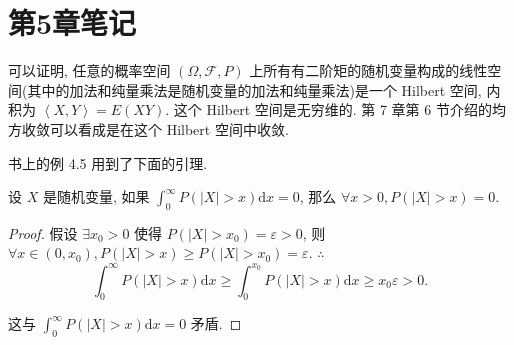 \documentclass{ctexart}
\begin{document}
\section{第5章笔记}
可以证明, 任意的概率空间 $(\Omega,\mathcal{F},P)$ 上所有有二阶矩的随机变量构成的线性空间(其中的加法和纯量乘法是随机变量的加法和纯量乘法)是一个 Hilbert 空间, 内积为 $\left<X,Y\right>=E(XY)$. 这个 Hilbert 空间是无穷维的. 第 7 章第 6 节介绍的均方收敛可以看成是在这个 Hilbert 空间中收敛.

书上的例 4.5 用到了下面的引理.
\begin{lemma}
    设 $X$ 是随机变量, 如果 $\int_0^\infty P(|X|>x)\mathrm{d}x=0$, 那么 $\forall x>0,P(|X|>x)=0$.
\end{lemma}
\begin{proof}
    假设 $\exists x_0>0$ 使得 $P(|X|>x_0)=\varepsilon>0$, 则 $\forall x\in(0,x_0),P(|X|>x)\geq P(|X|>x_0)=\varepsilon$. $\therefore$
    \[\int_0^\infty P(|X|>x)\mathrm{d}x\geq\int_0^{x_0}P(|X|>x)\mathrm{d}x\geq x_0\varepsilon>0.\]

    这与 $\int_0^\infty P(|X|>x)\mathrm{d}x=0$ 矛盾.
\end{proof}
\end{document}
